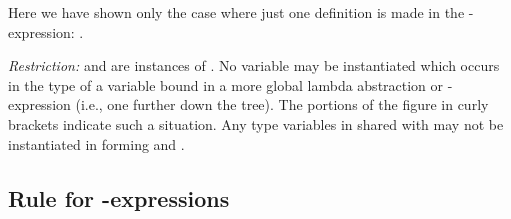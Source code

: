 \plainbox{
    \[
\inferrule*[vcenter, right={\!\textnormal{\ml{let x.}}}]{
    \inferrule*[vcenter, fraction={\cdot\cdots\cdot}]
    {
        \{ \text{\ml{\ldots{} y \hastype{} C \ldots{}}} \}
    }
    {
        \inferrule*[vcenter, fraction={\cdot\cdots\cdot}]
        {\phantom{text}}
        {\text{ \ml{x \hastype{} A} }}
    }
    \\
    \inferrule*[vcenter, fraction={\cdot\cdots\cdot}]
    {
        \text{\ml{ \ldots{} x \hastype{} A$'$ \ldots{} x \hastype{} A$''$ \ldots{}}}
    }
    {
       \text{\ml{B}}
    }
}
{
    {
    \begin{tabular}{lcr}
        & \ml{B} \phantom{w} & \\
        $\{$\phantom{hacked} &  $\cdots$ \phantom{w} & \phantom{hack}$\}$ \\
        $\{$ &  ------\ml{\tlb{y}}  & $\}$ \\
        $\{$ &  $\cdots$ \phantom{w} & $\}$
    \end{tabular}
    }
}
\]
}

\noindent
Here we have shown only the case where just one definition is made in the
-expression: .

\textit{Restriction:}  and  are instances of . No variable may be instantiated
which occurs in the type of a variable bound in a more global lambda
abstraction or -expression (i.e., one further down the tree). The portions
of the figure in curly brackets indicate such a situation. Any type variables in 
shared with  may not be instantiated in forming  and .

\subsection{Rule for -expressions}

\plainbox{
    \[
    \inferrule*[vcenter, right={\!\textnormal{\ml{letrec x.}}}]{
            \inferrule*[vcenter, fraction={\cdot\cdots\cdot}]
            {
                \text{\ml{\ldots{} x \hastype{} A \ldots{} x \hastype{} A \ldots{}}}
            }
            {
                \inferrule*[vcenter, fraction={\cdot\cdots\cdot}]
                {\phantom{text}}
                {\text{ \ml{x \hastype{} A} }}
            }
            \\
            \inferrule*[vcenter, fraction={\cdot\cdots\cdot}]
            {
                \text{\ml{ \ldots{} x \hastype{} A$'$ \ldots{} x \hastype{} A$''$ \ldots{}}}
            }
            {
                \text{\ml{B}}
            }
        }
        {
            \text{\ml{B}}
        }
        \]
    }

